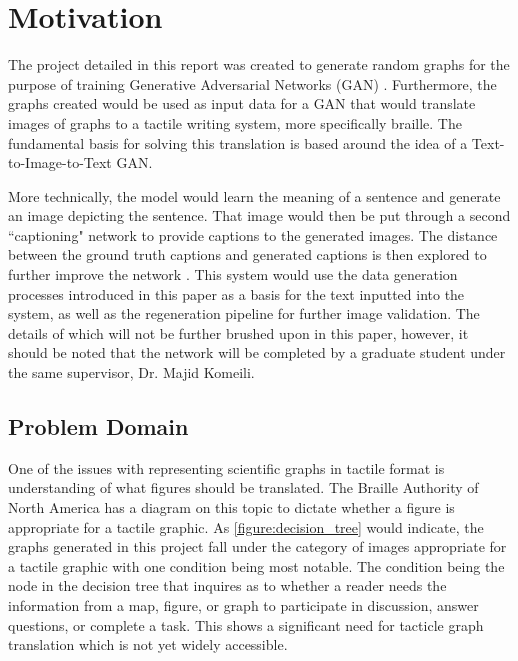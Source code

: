 \chapter{Motivation}
The project detailed in this report was created to generate random graphs for the purpose of training Generative Adversarial Networks (GAN) \cite{goodfellow2014generative}. Furthermore, the graphs created would be used as input data for a GAN that would translate images of graphs to a tactile writing system, more specifically braille. The fundamental basis for solving this translation is based around the idea of a Text-to-Image-to-Text GAN.

\hfill

More technically, the model would learn the meaning of a sentence and generate an image depicting the sentence. That image would then be put through a second ``captioning" network to provide captions to the generated images. The distance between the ground truth captions and generated captions is then explored to further improve the network \cite{hu2021text}. This system would use the data generation processes introduced in this paper as a basis for the text inputted into the system, as well as the regeneration pipeline for further image validation. The details of which will not be further brushed upon in this paper, however, it should be noted that the network will be completed by a graduate student under the same supervisor, Dr. Majid Komeili.


\section{Problem Domain}
One of the issues with representing scientific graphs in tactile format is understanding of what figures should be translated. The Braille Authority of North America has a diagram on this topic to dictate whether a figure is appropriate for a tactile graphic. As \autoref{figure:decision_tree} would indicate, the graphs generated in this project fall under the category of images appropriate for a tactile graphic with one condition being most notable. The condition being the node in the decision tree that inquires as to whether a reader needs the information from a map, figure, or graph to participate in discussion, answer questions, or complete a task. This shows a significant need for tacticle graph translation which is not yet widely accessible.


